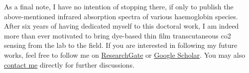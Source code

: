 As a final note, I have no intention of stopping there, if only to publish the above-mentioned infrared absorption spectra of various haemoglobin species. After six years of having dedicated myself to this doctoral work, I am indeed more than ever motivated to bring dye-based thin film transcutaneous \gls{co2} sensing from the lab to the field. If you are interested in following my future works, feel free to follow me on \href{http://web.archive.org/web/20241009063754/https://www.researchgate.net/profile/Emmanuel-Dervieux-2}{ResearchGate} or \href{https://web.archive.org/web/20241009063905/https://scholar.google.fr/citations?user=DCR_h9YAAAAJ&hl=fr}{Google Scholar}. You may also \href{mailto:emmanuel.dervieux@gmail.com}{contact me} directly for further discussions.
